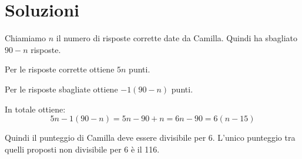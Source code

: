 \chapter{Soluzioni}
\label{ch:soluzioni}


\begin{soluzione}
    Chiamiamo $n$ il numero di risposte corrette date da Camilla.
    Quindi ha sbagliato $90 - n$ risposte.

    Per le risposte corrette ottiene $5n$ punti.

    Per le risposte sbagliate ottiene $-1(90-n)$ punti.

    In totale ottiene:
    \[
        5n - 1(90 - n) = 5n - 90 + n = 6n - 90 = 6(n - 15)
    \]

    Quindi il punteggio di Camilla deve essere divisibile per 6.
    L'unico punteggio tra quelli proposti non divisibile per 6 è il 116.



\end{soluzione}

